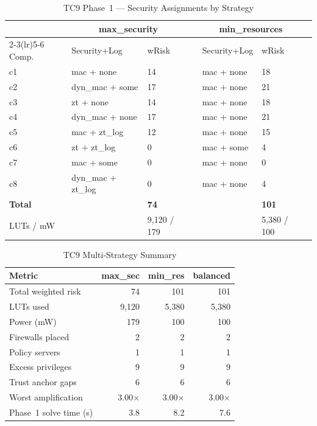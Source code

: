 \documentclass[conference]{IEEEtran}
\begin{document}
\begin{table}[t]
\caption{TC9 Phase~1 --- Security Assignments by Strategy}
\label{tab:tc9p1}
\centering
\scriptsize
\setlength{\tabcolsep}{3pt}
\begin{tabular}{lllrllr}
\toprule
 & \multicolumn{2}{c}{max\_security} & & \multicolumn{2}{c}{min\_resources} & \\
\cmidrule(lr){2-3}\cmidrule(lr){5-6}
Comp. & Security+Log & wRisk & & Security+Log & wRisk \\
\midrule
c1 & mac + none         & 14 & & mac + none        & 18 \\
c2 & dyn\_mac + some    & 17 & & mac + none        & 21 \\
c3 & zt + none          & 14 & & mac + none        & 18 \\
c4 & dyn\_mac + none    & 17 & & mac + none        & 21 \\
c5 & mac + zt\_log      & 12 & & mac + none        & 15 \\
c6 & zt + zt\_log       &  0 & & mac + some        &  4 \\
c7 & mac + some         &  0 & & mac + none        &  0 \\
c8 & dyn\_mac + zt\_log &  0 & & mac + none        &  4 \\
\midrule
\textbf{Total} & & \textbf{74} & & & \textbf{101} \\
LUTs / mW & & 9,120 / 179 & & & 5,380 / 100 \\
\bottomrule
\end{tabular}
\end{table}

\begin{table}[t]
\caption{TC9 Multi-Strategy Summary}
\label{tab:tc9strat}
\centering
\scriptsize
\begin{tabular}{lrrr}
\toprule
Metric & max\_sec & min\_res & balanced \\
\midrule
Total weighted risk     &  74 & 101 & 101 \\
LUTs used               & 9,120 & 5,380 & 5,380 \\
Power (mW)              & 179 & 100 & 100 \\
Firewalls placed        &   2 &   2 &   2 \\
Policy servers          &   1 &   1 &   1 \\
Excess privileges       &   9 &   9 &   9 \\
Trust anchor gaps       &   6 &   6 &   6 \\
Worst amplification     & 3.00$\times$ & 3.00$\times$ & 3.00$\times$ \\
Phase~1 solve time (s)  & 3.8 & 8.2 & 7.6 \\
\bottomrule
\end{tabular}
\end{table}
\end{document}
